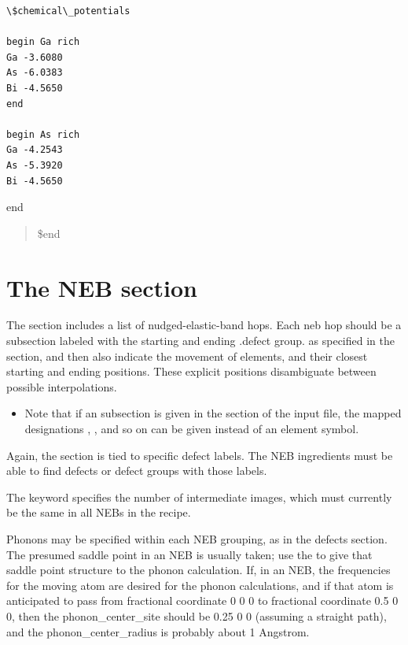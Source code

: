 \documentclass[letterpaper,10pt,english]{sphinxmanual}
\begin{document}
\begin{Verbatim}[commandchars=\\\{\}]
\$chemical\_potentials

begin Ga rich
Ga -3.6080
As -6.0383
Bi -4.5650
end

begin As rich
Ga -4.2543
As -5.3920
Bi -4.5650
\end{Verbatim}

end
\begin{quote}

\$end
\end{quote}


\section{The NEB section}
\label{3_0_inputfile:the-neb-section}
The  section includes a list of nudged-elastic-band hops. Each neb hop should be a subsection labeled with the starting and ending .defect group. as specified in the  section, and then also indicate the movement of elements, and their closest starting and ending positions. These explicit positions disambiguate between possible interpolations.
\begin{itemize}
\item {} 
Note that if an  subsection is given in the  section of the input file, the mapped designations , , and so on can be given instead of an element symbol.

\end{itemize}

Again, the  section is tied to specific defect labels. The NEB ingredients must be able to find defects or defect groups with those labels.

The  keyword specifies the number of intermediate images, which must currently be the same in all NEBs in the recipe.

Phonons may be specified within each NEB grouping, as in the defects section. The presumed saddle point in an NEB is usually taken; use the  to give that saddle point structure to the phonon calculation. If, in an NEB, the frequencies for the moving atom are desired for the phonon calculations, and if that atom is anticipated to pass from fractional coordinate 0 0 0 to fractional coordinate 0.5 0 0, then the phonon\_center\_site should be 0.25 0 0 (assuming a straight path), and the phonon\_center\_radius is probably about 1 Angstrom.
\end{document}
